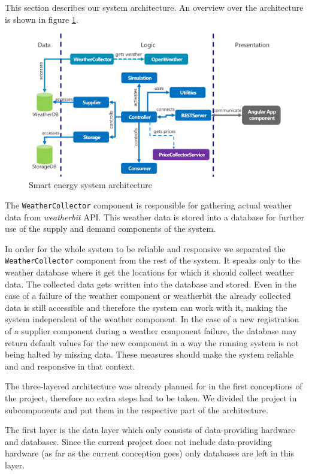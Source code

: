 This section describes our system architecture.
An overview over the architecture is shown in figure \ref{fig:architecture}.
\begin{figure}[!h]
	\centering
	\includegraphics[width=1.00\textwidth]{../figures/Architecture.pdf}
	\caption{Smart energy system architecture}
	\label{fig:architecture}
\end{figure}

The \texttt{WeatherCollector} component is responsible for gathering actual weather data from \textit{weatherbit} API.
This weather data is stored into a database for further use of the supply and demand components of the system.

In order for the whole system to be reliable and responsive we separated the \texttt{WeatherCollector} component from the rest of the system.
It speaks only to the weather database where it get the locations for which it should collect weather data.
The collected data gets written into the database and stored.
Even in the case of a failure of the weather component or weatherbit the already collected data is still accessible and therefore the system can work with it, making the system independent of the weather component.
In the case of a new registration of a supplier component during a weather component failure, the database may return default values for the new component in a way the running system is not being halted by missing data.
These measures should make the system reliable and and responsive in that context.

The three-layered architecture was already planned for in the first conceptions of the project, therefore no extra steps had to be taken.
We divided the project in subcomponents and put them in the respective part of the architecture.

The first layer is the data layer which only consists of data-providing hardware and databases. 
Since the current project does not include data-providing hardware (as far as the current conception goes) only databases are left in this layer.

